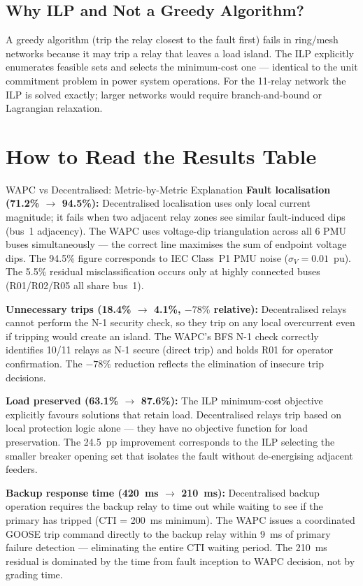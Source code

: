 \documentclass[12pt,a4paper]{article}
\begin{document}
\subsection{Why ILP and Not a Greedy Algorithm?}

A greedy algorithm (trip the relay closest to the fault first) fails in ring/mesh networks because it may trip a relay that leaves a load island. The ILP explicitly enumerates feasible sets and selects the minimum-cost one — identical to the unit commitment problem in power system operations. For the 11-relay network the ILP is solved exactly; larger networks would require branch-and-bound or Lagrangian relaxation.

\section{How to Read the Results Table}

\begin{resultbox}{WAPC vs Decentralised: Metric-by-Metric Explanation}
\textbf{Fault localisation (71.2\% $\to$ 94.5\%):}
Decentralised localisation uses only local current magnitude; it fails when two adjacent relay zones see similar fault-induced dips (bus~1 adjacency). The WAPC uses voltage-dip triangulation across all 6 PMU buses simultaneously — the correct line maximises the sum of endpoint voltage dips. The 94.5\% figure corresponds to IEC Class~P1 PMU noise ($\sigma_V = 0.01$~pu). The 5.5\% residual misclassification occurs only at highly connected buses (R01/R02/R05 all share bus~1).

\medskip
\textbf{Unnecessary trips (18.4\% $\to$ 4.1\%, $-78\%$ relative):}
Decentralised relays cannot perform the N-1 security check, so they trip on any local overcurrent even if tripping would create an island. The WAPC's BFS N-1 check correctly identifies 10/11 relays as N-1 secure (direct trip) and holds R01 for operator confirmation. The $-78\%$ reduction reflects the elimination of insecure trip decisions.

\medskip
\textbf{Load preserved (63.1\% $\to$ 87.6\%):}
The ILP minimum-cost objective explicitly favours solutions that retain load. Decentralised relays trip based on local protection logic alone — they have no objective function for load preservation. The 24.5~pp improvement corresponds to the ILP selecting the smaller breaker opening set that isolates the fault without de-energising adjacent feeders.

\medskip
\textbf{Backup response time (420~ms $\to$ 210~ms):}
Decentralised backup operation requires the backup relay to time out while waiting to see if the primary has tripped (CTI = 200~ms minimum). The WAPC issues a coordinated GOOSE trip command directly to the backup relay within 9~ms of primary failure detection — eliminating the entire CTI waiting period. The 210~ms residual is dominated by the time from fault inception to WAPC decision, not by grading time.
\end{resultbox}
\end{document}
